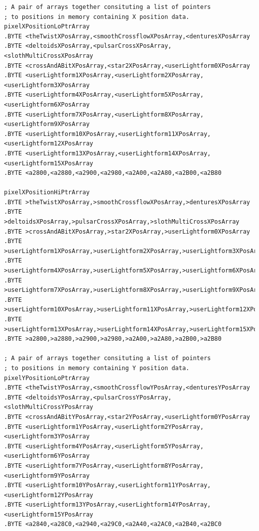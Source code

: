 \begin{lstlisting}[basicstyle=\ttfamily\scriptsize,caption = All the pattern data structures in Colourspace organized into a set of arrays. 
We use these arrays to choose the correct user-selected pattern at painting time.]
; A pair of arrays together consituting a list of pointers
; to positions in memory containing X position data.
pixelXPositionLoPtrArray   
.BYTE <theTwistXPosArray,<smoothCrossflowXPosArray,<denturesXPosArray
.BYTE <deltoidsXPosArray,<pulsarCrossXPosArray,<slothMultiCrossXPosArray
.BYTE <crossAndABitXPosArray,<star2XPosArray,<userLightform0XPosArray
.BYTE <userLightform1XPosArray,<userLightform2XPosArray,<userLightform3XPosArray
.BYTE <userLightform4XPosArray,<userLightform5XPosArray,<userLightform6XPosArray
.BYTE <userLightform7XPosArray,<userLightform8XPosArray,<userLightform9XPosArray
.BYTE <userLightform10XPosArray,<userLightform11XPosArray,<userLightform12XPosArray
.BYTE <userLightform13XPosArray,<userLightform14XPosArray,<userLightform15XPosArray
.BYTE <a2800,<a2880,<a2900,<a2980,<a2A00,<a2A80,<a2B00,<a2B80

pixelXPositionHiPtrArray   
.BYTE >theTwistXPosArray,>smoothCrossflowXPosArray,>denturesXPosArray
.BYTE >deltoidsXPosArray,>pulsarCrossXPosArray,>slothMultiCrossXPosArray
.BYTE >crossAndABitXPosArray,>star2XPosArray,>userLightform0XPosArray
.BYTE >userLightform1XPosArray,>userLightform2XPosArray,>userLightform3XPosArray
.BYTE >userLightform4XPosArray,>userLightform5XPosArray,>userLightform6XPosArray
.BYTE >userLightform7XPosArray,>userLightform8XPosArray,>userLightform9XPosArray
.BYTE >userLightform10XPosArray,>userLightform11XPosArray,>userLightform12XPosArray
.BYTE >userLightform13XPosArray,>userLightform14XPosArray,>userLightform15XPosArray
.BYTE >a2800,>a2880,>a2900,>a2980,>a2A00,>a2A80,>a2B00,>a2B80

; A pair of arrays together consituting a list of pointers
; to positions in memory containing Y position data.
pixelYPositionLoPtrArray   
.BYTE <theTwistYPosArray,<smoothCrossflowYPosArray,<denturesYPosArray
.BYTE <deltoidsYPosArray,<pulsarCrossYPosArray,<slothMultiCrossYPosArray
.BYTE <crossAndABitYPosArray,<star2YPosArray,<userLightform0YPosArray
.BYTE <userLightform1YPosArray,<userLightform2YPosArray,<userLightform3YPosArray
.BYTE <userLightform4YPosArray,<userLightform5YPosArray,<userLightform6YPosArray
.BYTE <userLightform7YPosArray,<userLightform8YPosArray,<userLightform9YPosArray
.BYTE <userLightform10YPosArray,<userLightform11YPosArray,<userLightform12YPosArray
.BYTE <userLightform13YPosArray,<userLightform14YPosArray,<userLightform15YPosArray
.BYTE <a2840,<a28C0,<a2940,<a29C0,<a2A40,<a2AC0,<a2B40,<a2BC0


\end{lstlisting}
